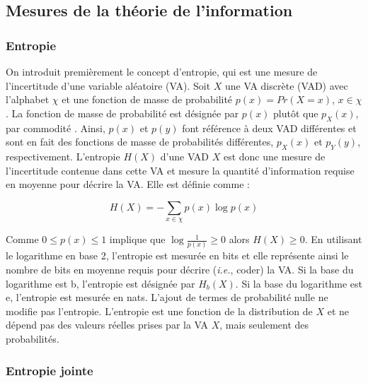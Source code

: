 \subsection{Mesures de la théorie de l'information}
\label{mesuresinformation}

\subsubsection{Entropie}
\label{entropie}

On introduit premièrement le concept d'entropie, qui est une mesure de l'incertitude d'une variable aléatoire (VA). 
Soit $X$ une VA discrète (VAD) avec l'alphabet $\chi$ et une fonction de masse de probabilité $p(x)=Pr(X=x)$, $x \in \chi$. 
La fonction de masse de probabilité est désignée par $p(x)$ plutôt que $p_X(x)$, par commodité \citep{cover2006}. 
Ainsi, $p(x)$ et $p(y)$ font référence à deux VAD différentes et sont en fait des fonctions de masse de probabilités différentes, $p_X(x)$ et $p_Y(y)$, respectivement. 
L'entropie $H(X)$ d'une VAD $X$ est donc une mesure de l'incertitude contenue dans cette VA et mesure la quantité d'information requise en moyenne pour décrire la VA. 
Elle est définie comme :

\begin{equation}
H(X) = - \sum_{x \in \chi}{p(x) \log p(x)}
\end{equation}

Comme $0 \leq p(x) \leq 1$ implique que $\log \frac{1}{p(x)} \geq 0$ alors $H(X) \geq 0$. 
En utilisant le logarithme en base 2, l'entropie est mesurée en bits et elle représente ainsi le nombre de bits en moyenne requis pour décrire (\textit{i.e.}, coder) la VA. 
Si la base du logarithme est b, l'entropie est désignée par $H_b(X)$. 
Si la base du logarithme est e, l'entropie est mesurée en nats. 
L'ajout de termes de probabilité nulle ne modifie pas l'entropie. 
L'entropie est une fonction de la distribution de $X$ et ne dépend pas des valeurs réelles prises par la VA $X$, mais seulement des probabilités. 

\subsubsection{Entropie jointe}
\label{jointen}

